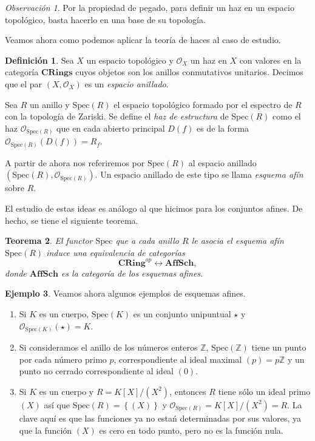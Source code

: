 \documentclass[12pt,a4paper]{article}
\newtheorem{thm}{Teorema}[section]
\theoremstyle{definition} \newtheorem{defn}[thm]{Definición}
\theoremstyle{definition} \newtheorem{ejemplo}[thm]{Ejemplo}
\theoremstyle{definition} \newtheorem{ejercicio}[thm]{Ejercicio}
\theoremstyle{remark} \newtheorem*{obs}{Observación}
\def\sp{\mathrm{Spec}}
\def\ZZ{\mathbb{Z}}
\def\OO{\mathscr{O}}
\begin{document}
	\begin{obs}
	  Por la propiedad de pegado, para definir un haz en un espacio topológico, basta hacerlo en una base de su topología.
	\end{obs}

	Veamos ahora como podemos aplicar la teoría de haces al caso de estudio.
	\begin{defn}
	  Sea $X$ un espacio topológico y $\OO_X$ un haz en $X$ con valores en la categoría $\mathbf{CRings}$ cuyos objetos son los anillos conmutativos unitarios. Decimos que el par $(X,\OO_X)$ es un \emph{espacio anillado}.

	  Sea $R$ un anillo y $\sp(R)$ el espacio topológico formado por el espectro de $R$ con la topología de Zariski. Se define el \emph{haz de estructura} de $\sp(R)$ como el haz $\OO_{\sp(R)}$ que en cada abierto principal $D(f)$ es de la forma $\OO_{\sp(R)}(D(f))=R_f$. 

	  A partir de ahora nos referiremos por $\sp(R)$ al espacio anillado $(\sp(R),\OO_{\sp(R)})$. Un espacio anillado de este tipo se llama \emph{esquema afín} sobre $R$.
	\end{defn}

	El estudio de estas ideas es análogo al que hicimos para los conjuntos afines. De hecho, se tiene el siguiente teorema.
	\begin{thm}
	  El functor $\sp$ que a cada anillo $R$ le asocia el esquema afín $\sp(R)$ induce una equivalencia de categorías
	  \begin{equation*}
	    \mathbf{CRing}^{op}\longleftrightarrow \mathbf{AffSch},
	  \end{equation*}
	  donde $\mathbf{AffSch}$ es la categoría de los esquemas afines.
	\end{thm}

	\begin{ejemplo}
	  Veamos ahora algunos ejemplos de esquemas afines.
\begin{enumerate}
  \item Si $K$ es un cuerpo, $\sp(K)$ es un conjunto unipuntual $\star$ y $\OO_{\sp(K)}(\star)=K$.
  \item Si consideramos el anillo de los números enteros $\ZZ$, $\sp(\ZZ)$ tiene un punto por cada número primo $p$, correspondiente al ideal maximal $(p)=p\ZZ$ y un punto no cerrado correspondiente al ideal $(0)$.
  \item Si $K$ es un cuerpo y $R=K[X]/(X^2)$, entonces $R$ tiene sólo un ideal primo $(X)$ así que $\sp(R)=\left\{ (X) \right\}$ y $\OO_{\sp(R)}=K[X]/(X^2)=R$. La clave aquí es que las funciones ya no estań determinadas por sus valores, ya que la función $(X)$ es cero en todo punto, pero no es la función nula.
\end{enumerate}
	\end{ejemplo}
\end{document}
